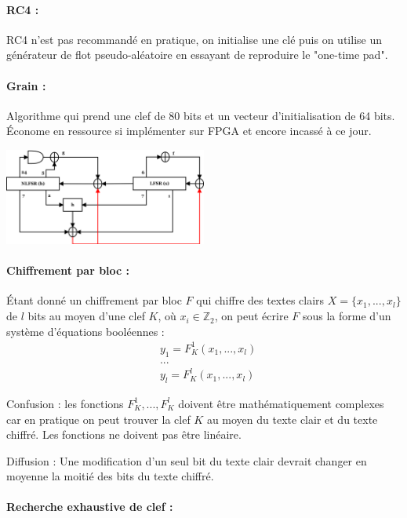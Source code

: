 \documentclass[11pt,a4paper]{report}
\begin{document}
\paragraph*{RC4 :}

RC4 n'est pas recommandé en pratique, on initialise une clé puis on utilise un générateur de flot pseudo-aléatoire en essayant de reproduire le "one-time pad".

\paragraph*{Grain :}

Algorithme qui prend une clef de 80 bits et un vecteur d'initialisation de 64 bits. Économe en ressource si implémenter sur FPGA et encore incassé à ce jour.

\begin{center}
\includegraphics[width=0.5\textwidth]{img/Grain_init.png}
\end{center}

\paragraph*{Chiffrement par bloc :}

Étant donné un chiffrement par bloc $F$ qui chiffre des textes clairs $X = \{x_1,...,x_l\}$ de $l$ bits au moyen d'une clef $K$, où $x_i \in \mathbb{Z}_2$, on peut écrire $F$ sous la forme d'un système d'équations booléennes :
\begin{align*}
&y_1 = F^1_K(x_1,...,x_l) \\
&... \\
&y_l = F^l_K(x_1,...,x_l)
\end{align*}

Confusion : les fonctions $F^1_K,...,F^l_K$ doivent être mathématiquement complexes car en pratique on peut trouver la clef $K$ au moyen du texte clair et du texte chiffré. Les fonctions ne doivent pas être linéaire.

Diffusion : Une modification d'un seul bit du texte clair devrait changer en moyenne la moitié des bits du texte chiffré.

\paragraph*{Recherche exhaustive de clef :}
\end{document}
